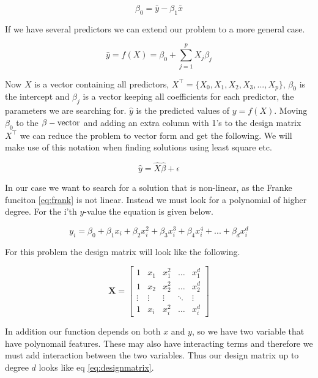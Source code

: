 \documentclass[a4paper,12pt, english]{article}
\begin{document}
\begin{equation}
\beta_0 = \bar{y} - \beta_1 \bar{x}
\end{equation}

If we have several predictors we can extend our problem to a more general case.

\begin{equation}
\hat{y} = f(X) = \beta_{0} + \sum_{j=1}^{p} X_{j} \beta_{j}
\end{equation}

Now $X$ is a vector containing all predictors, $X^{\top} = \{X_0, X_1, X_2, X_3,..., X_p\}$, $\beta_0$ is the intercept and $\beta_j$ is a vector keeping all coefficients for each predictor, the parameters we are searching for. $\hat{y}$ is the predicted values of $y = f(X)$. Moving $\beta_0$ to the $\beta-\textnormal{vector}$ and adding an extra column with 1's to the design matrix $X^{\top}$ we can reduce the problem to vector form and get the following. We will make use of this notation when finding solutions using least square etc. 

\begin{equation} \label{eq:y_predict}
\hat{y} = \hat{X} \hat{\beta} + \epsilon
\end{equation}

In our case we want to search for a solution that is non-linear, as the Franke funciton \ref{eq:frank} is not linear. Instead we must look for a polynomial of higher degree. For the i'th $y$-value the equation is given below.

\begin{equation}
y_i = \beta_0 + \beta_1 x_i + \beta_2 x_i^{2} + \beta_3 x_i^{3} + \beta_4 x_i^{4} + ... + \beta_d x_i^{d}
\end{equation}

For this problem the design matrix will look like the following.

\begin{equation}
\mathbf{X} = 
\begin{bmatrix}
1 & x_1 & x_1^2 & \dots  & x_1^d \\
1 & x_2 & x_2^2 & \dots  & x_2^d \\
\vdots & \vdots & \vdots & \ddots & \vdots \\
1 & x_i & x_i^2 & \dots  & x_i^d
\end{bmatrix}
\end{equation}

In addition our function depends on both $x$ and $y$, so we have two variable that have polynomail features. These may also have interacting terms and therefore we must add interaction between the two variables. Thus our design matrix up to degree $d$ looks like eq \ref{eq:designmatrix}.
\end{document}
